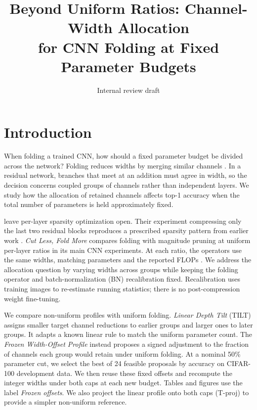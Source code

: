 \documentclass[11pt,a4paper]{article}
\title{Beyond Uniform Ratios: Channel-Width Allocation\\for CNN Folding at Fixed Parameter Budgets}
\author{}
\date{Internal review draft}
\newcommand{\Tilt}{TILT}
\newcommand{\TiltName}{Linear Depth Tilt}
\newcommand{\FrozenProfile}{Frozen Width-Offset Profile}
\newcommand{\FrozenShort}{Frozen offsets}
\begin{document}
\maketitle


\section{Introduction}
\label{sec:intro}

When folding a trained CNN, how should a fixed parameter budget be
divided across the network? Folding reduces widths by merging similar
channels \citep{wang2025fold,saukh2026cut}. In a residual network, branches
that meet at an addition must agree in width, so the decision concerns
coupled groups of channels rather than independent layers. We study
how the allocation of retained channels affects top-1 accuracy when
the total number of parameters is held approximately fixed.

\citet[p.~13]{wang2025fold} leave per-layer sparsity optimization open.
Their experiment compressing only the last two residual blocks reproduces
a prescribed sparsity pattern from earlier work \citep[Fig.~7]{wang2025fold}.
\emph{Cut Less, Fold More} compares folding with magnitude pruning at
uniform per-layer ratios in its main CNN experiments. At each ratio,
the operators use the same widths, matching parameters and the reported
FLOPs \citep[Figs.~1 and 8; Appendix~F.2, Table~7]{saukh2026cut}.
We address the allocation question by varying widths across groups while
keeping the folding operator and batch-normalization (BN) recalibration
fixed. Recalibration uses training images to re-estimate running
statistics; there is no post-compression weight fine-tuning.

We compare non-uniform profiles with uniform folding. \emph{\TiltName{}} (\Tilt{})
assigns smaller target channel reductions to earlier groups and larger ones
to later groups. It adapts a known linear rule
\citep{su2020random,huang2025atp} to match the uniform parameter count.
The \emph{\FrozenProfile{}} instead proposes a signed adjustment to the
fraction of channels each group would retain under uniform folding. At a
nominal 50\% parameter cut, we select the best of 24 feasible proposals
by accuracy on CIFAR-100 development data. We then reuse these fixed
offsets and recompute the integer widths under both caps at each new
budget. Tables and figures use the label \emph{\FrozenShort{}}.
We also project the linear profile onto both caps (T-proj) to provide
a simpler non-uniform reference.
\end{document}
